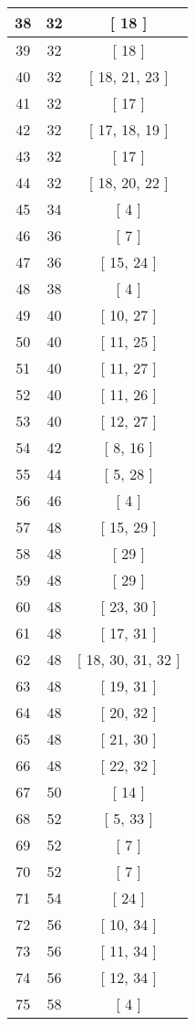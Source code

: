 \begin{center}
\begin{longtable}[H]{|| c c c ||}
\\\hline
38 & 32 & [ 18 ]
\\\hline
39 & 32 & [ 18 ]
\\\hline
40 & 32 & [ 18, 21, 23 ]
\\\hline
41 & 32 & [ 17 ]
\\\hline
42 & 32 & [ 17, 18, 19 ]
\\\hline
43 & 32 & [ 17 ]
\\\hline
44 & 32 & [ 18, 20, 22 ]
\\\hline
45 & 34 & [ 4 ]
\\\hline
46 & 36 & [ 7 ]
\\\hline
47 & 36 & [ 15, 24 ]
\\\hline
48 & 38 & [ 4 ]
\\\hline
49 & 40 & [ 10, 27 ]
\\\hline
50 & 40 & [ 11, 25 ]
\\\hline
51 & 40 & [ 11, 27 ]
\\\hline
52 & 40 & [ 11, 26 ]
\\\hline
53 & 40 & [ 12, 27 ]
\\\hline
54 & 42 & [ 8, 16 ]
\\\hline
55 & 44 & [ 5, 28 ]
\\\hline
56 & 46 & [ 4 ]
\\\hline
57 & 48 & [ 15, 29 ]
\\\hline
58 & 48 & [ 29 ]
\\\hline
59 & 48 & [ 29 ]
\\\hline
60 & 48 & [ 23, 30 ]
\\\hline
61 & 48 & [ 17, 31 ]
\\\hline
62 & 48 & [ 18, 30, 31, 32 ]
\\\hline
63 & 48 & [ 19, 31 ]
\\\hline
64 & 48 & [ 20, 32 ]
\\\hline
65 & 48 & [ 21, 30 ]
\\\hline
66 & 48 & [ 22, 32 ]
\\\hline
67 & 50 & [ 14 ]
\\\hline
68 & 52 & [ 5, 33 ]
\\\hline
69 & 52 & [ 7 ]
\\\hline
70 & 52 & [ 7 ]
\\\hline
71 & 54 & [ 24 ]
\\\hline
72 & 56 & [ 10, 34 ]
\\\hline
73 & 56 & [ 11, 34 ]
\\\hline
74 & 56 & [ 12, 34 ]
\\\hline
75 & 58 & [ 4 ]

\end{longtable}
\end{center}
